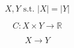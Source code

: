 \documentclass{article}
\begin{document}
$$ X, Y \text{ s.t. } |X| = |Y|$$

$$ C: X \times Y \rightarrow  \mathbb{R}$$

$$ X \rightarrow Y $$
\end{document}
